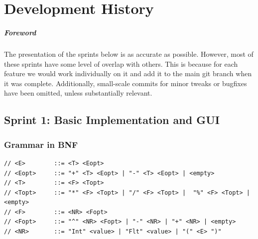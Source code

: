 \documentclass[a4paper, oneside, 11pt]{report}
\begin{document}
	\chapter{Development History}\label{Chap:DevHist}






	\paragraph{Foreword} The presentation of the sprints below is as accurate as possible. However, most of these sprints have some level of overlap with others. This is because for each feature we would work individually on it and add it to the main git branch when it was complete. Additionally, small-scale commits for minor tweaks or bugfixes have been omitted, unless substantially relevant.


	\section{Sprint 1: Basic Implementation and GUI}
	\subsection{Grammar in BNF}
	\begin{verbatim}
// <E>        ::= <T> <Eopt>
// <Eopt>     ::= "+" <T> <Eopt> | "-" <T> <Eopt> | <empty>
// <T>        ::= <F> <Topt>
// <Topt>     ::= "*" <F> <Topt> | "/" <F> <Topt> |  "%" <F> <Topt> |<empty>
// <F>        ::= <NR> <Fopt>
// <Fopt>     ::= "^" <NR> <Fopt> | "-" <NR> | "+" <NR> | <empty>
// <NR>       ::= "Int" <value> | "Flt" <value> | "(" <E> ")"
	\end{verbatim}
\end{document}
